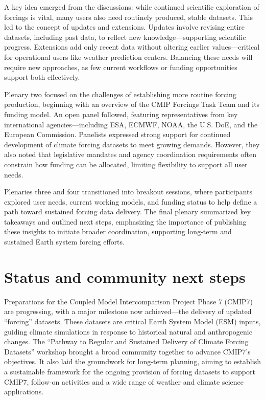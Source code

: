 \documentclass{ametsocV6.1}
\begin{document}
A key idea emerged from the discussions: while continued scientific exploration of forcings is vital, many users also need routinely produced, stable datasets. This led to the concept of updates and extensions. Updates involve revising entire datasets, including past data, to reflect new knowledge—supporting scientific progress. Extensions add only recent data without altering earlier values—critical for operational users like weather prediction centers. Balancing these needs will require new approaches, as few current workflows or funding opportunities support both effectively.

Plenary two focused on the challenges of establishing more routine forcing production, beginning with an overview of the CMIP Forcings Task Team and its funding model. An open panel followed, featuring representatives from key international agencies—including ESA, ECMWF, NOAA, the U.S. DoE, and the European Commission. Panelists expressed strong support for continued development of climate forcing datasets to meet growing demands. However, they also noted that legislative mandates and agency coordination requirements often constrain how funding can be allocated, limiting flexibility to support all user needs.

Plenaries three and four transitioned into breakout sessions, where participants explored user needs, current working models, and funding status to help define a path toward sustained forcing data delivery. The final plenary summarized key takeaways and outlined next steps, emphasizing the importance of publishing these insights to initiate broader coordination, supporting long-term and sustained Earth system forcing efforts.

\section*{Status and community next steps}
Preparations for the Coupled Model Intercomparison Project Phase 7 (CMIP7) are progressing, with a major milestone now achieved—the delivery of updated ``forcing'' datasets. These datasets are critical Earth System Model (ESM) inputs, guiding climate simulations in response to historical natural and anthropogenic changes. The ``Pathway to Regular and Sustained Delivery of Climate Forcing Datasets'' workshop brought a broad community together to advance CMIP7’s objectives. It also laid the groundwork for long-term planning, aiming to establish a sustainable framework for the ongoing provision of forcing datasets to support CMIP7, follow-on activities and a wide range of weather and climate science applications.
\end{document}
